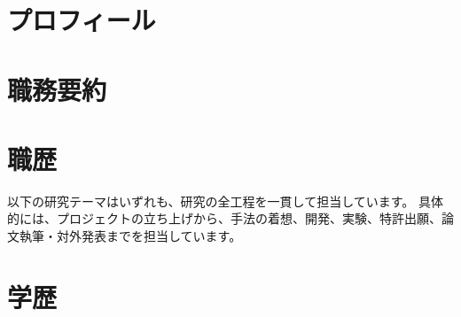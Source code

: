 \section{\textbf{プロフィール}}

\section{\textbf{職務要約}}

\section{\textbf{職歴}}
以下の研究テーマはいずれも、研究の全工程を一貫して担当しています。
具体的には、プロジェクトの立ち上げから、手法の着想、開発、実験、特許出願、論文執筆・対外発表までを担当しています。

\section{\textbf{学歴}}
